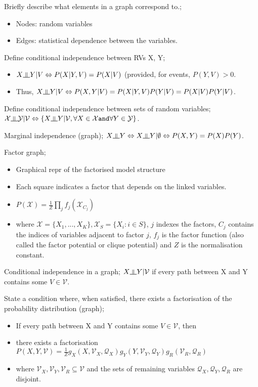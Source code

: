 \documentclass{article}
\newcommand{\indep}{\rotatebox[origin=c]{90}{$\models$}}
\begin{document}
	
Briefly describe what elements in a graph correspond to.; \begin{itemize} \item Nodes: random variables \item Edges: statistical dependence between the variables.  \end{itemize}

Define conditional independence between RVs X, Y; \begin{itemize} \item $X\indep Y|V \Leftrightarrow P(X|Y, V) = P(X|V)$ (provided, for events, $P(Y,V)>0$.  \item Thus, $X\indep Y|V \Leftrightarrow P(X,Y|V)=P(X|Y,V)P(Y|V)=P(X|V)P(Y|V)$.  \end{itemize}

Define conditional independence between sets of random variables; $\mathcal{X} \indep \mathcal{Y}|\mathcal{V} \Leftrightarrow \{X\indep Y | \mathcal{V}, \forall X \in \mathcal{X} \mathtt{ and }\forall Y \in \mathcal{Y}\}$.

Marginal independence (graph); $X\indep Y \Leftrightarrow X \indep Y | \emptyset \Leftrightarrow P(X,Y) = P(X)P(Y)$.

Factor graph; \begin{itemize} \item Graphical repr of the factorised model structure \item Each square indicates a factor that depends on the linked variables.  \item $P(\mathcal{X})=\frac{1}{Z}\prod_j f_j(\mathcal{X}_{C_j})$ \item where $\mathcal{X}=\{X_1,...,X_K\}, \mathcal{X}_S=\{X_i:i\in S\}$, $j$ indexes the factors, $C_j$ contains the indices of variables adjacent to factor $j$, $f_j$ is the factor function (also called the factor potential or clique potential) and $Z$ is the normalisation constant.  \end{itemize}

Conditional independence in a graph; $X\indep Y|\mathcal{V}$ if every path between X and Y contains some $V\in\mathcal{V}$.

State a condition where, when satisfied, there exists a factorisation of the probability distribution (graph); \begin{itemize} \item If every path between X and Y contains some $V\in\mathcal{V}$, then \item there exists a factorisation $P(X,Y,\mathcal{V})=\frac{1}{Z}g_X(X,\mathcal{V}_X, \mathcal{Q}_X)g_Y(Y,\mathcal{V}_Y, \mathcal{Q}_Y)g_R(\mathcal{V}_R, \mathcal{Q}_R)$ \item where $\mathcal{V}_X, \mathcal{V}_Y, \mathcal{V}_R \subseteq \mathcal{V}$ and the sets of remaining variables $\mathcal{Q}_X,\mathcal{Q}_Y,\mathcal{Q}_R$ are disjoint.  \end{itemize}
\end{document}
